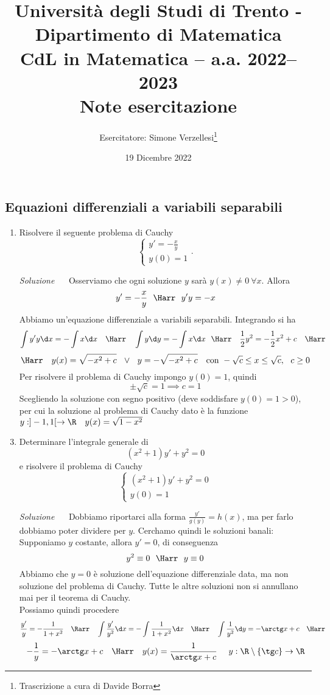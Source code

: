\documentclass{article}
\title{Università degli Studi di Trento - Dipartimento di Matematica\\
CdL in Matematica – a.a. 2022–2023\\ Note esercitazione}
\author{Esercitatore: Simone Verzellesi\thanks{Trascrizione a cura di Davide Borra}}
\date{19 Dicembre 2022}
\begin{document}
\maketitle
{}
\setlength{\headheight}{30pt}
\subsection*{Equazioni differenziali a variabili separabili}
\begin{enumerate}[label=\textbf{Esercizio 13.\arabic*.},itemindent=*]
\item Risolvere il seguente problema di Cauchy
\[\begin{cases}
    y'=-\frac{x}{y}\\
    y(0)=1
\end{cases}.\]

\item[\textit{\large Soluzione~}]~
Osserviamo che ogni soluzione $y$ sarà $y(x)\neq 0 ~\forall x$. Allora
\[y'=-\frac{x}{y}~ ~ \Harr ~~ y'y=- x\]
Abbiamo un'equazione differenziale a variabili separabili. Integrando si ha 
\[\int y'y\d x=-\int x \d x~~~\Harr~~~\int y\d y =-\int x \d x~~\Harr~~~\frac{1}{2}y^2=-\frac{1}{2}x^2+c~~~\Harr\]
\[\Harr~~~y(x)=\sqrt{-x^2+c}~~\lor~~ y=-\sqrt{-x^2+c}~~~\text{con}~-\sqrt{c}\leq x\leq \sqrt{c},~ ~ c\geq 0\]
Per risolvere il problema di Cauchy impongo $y(0)=1$, quindi
\[\pm\sqrt{c}=1\implies c=1\]
Scegliendo la soluzione con segno positivo (deve soddisfare $y(0)=1>0$), per cui la soluzione al problema di Cauchy dato è la funzione $y:]-1,1[\to \R~~~y(x)=\sqrt{1-x^2}$
\item Determinare l'integrale generale di 
\[
    (x^2+1)y'+y^2=0   
\]
e risolvere il problema di Cauchy
\[\begin{cases}
    (x^2+1)y'+y^2=0 \\
    y(0)=1
\end{cases}\]
\item[\textit{\large Soluzione~}]~ Dobbiamo riportarci alla forma $\frac{y'}{g(y)}=h(x)$, ma per farlo dobbiamo poter dividere per $y$. Cerchamo quindi le soluzioni banali: Supponiamo $y$ costante, allora $y'=0$, di conseguenza
\[y^2\equiv 0~~\Harr~~y\equiv 0\]
Abbiamo che $y=0$ è soluzione dell'equazione differenziale data, ma non soluzione del problema di Cauchy. Tutte le altre soluzioni non si annullano mai per il teorema di Cauchy.\\
Possiamo quindi procedere
\[\frac{y'}{y}=-\frac{1}{1+x^2}~~~\Rarr~~~\int\frac{y'}{y^2}\d x=-\int\frac{1}{1+x^2}\d x~~~\Harr~~~\int\frac{1}{y^2}\d y=-\arctg x+c~~~\Harr\]
\[-\frac{1}{y}=-\arctg x +c~~~\Harr~~~y(x)=\frac{1}{\arctg x +c}~~~~y: \R\setminus \{\tg c\}\to \R\]


\end{enumerate}
\end{document}
